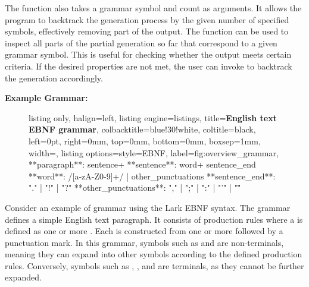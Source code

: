 The  function also takes a grammar symbol and count as arguments. 
It allows the program to backtrack the generation process by the given number of specified symbols, effectively removing part of the output.
The  function can be used to inspect all parts of the partial generation so far that correspond to a given grammar symbol. 
This is useful for checking whether the output meets certain criteria. 
If the desired properties are not met, the user can invoke  to backtrack the generation accordingly.

\noindent\textbf{Example Grammar:}

\begin{figure}
\vspace{-.1in}
\begin{minipage}{0.6\textwidth}
    \begin{tcblisting}{
        listing only, 
        halign=left,
        listing engine=listings,
        title=\textbf{\small English text EBNF grammar},
        colbacktitle=blue!30!white, 
        coltitle=black,
        left=0pt,               %
        right=0mm,              %
        top=0mm,                %
        bottom=0mm,             %
        boxsep=1mm,
        width=\textwidth,
        listing options={style=EBNF},
        label={fig:overview_grammar},
    }
    **paragraph**: sentence+
    **sentence**: word+ sentence_end
    **word**: /[a-zA-Z0-9]+/ | other_punctuations
    **sentence_end**: "." | "!" | "?"
    **other_punctuations**: "," | ";" | ":" | "'" | "\""
    \end{tcblisting}
    \label{fig:ebnf_grammar}
\end{minipage}
\vspace{-.25in}
\end{figure}

Consider an example of grammar using the Lark EBNF syntax.
The grammar defines a simple English text paragraph. 
It consists of production rules where a  is defined as one or more . 
Each  is constructed from one or more  followed by a  punctuation mark. 
In this grammar, symbols such as  and  are non-terminals, meaning they can expand into other symbols according to the defined production rules. 
Conversely, symbols such as , \str{!}, and  are terminals, as they cannot be further expanded. 


